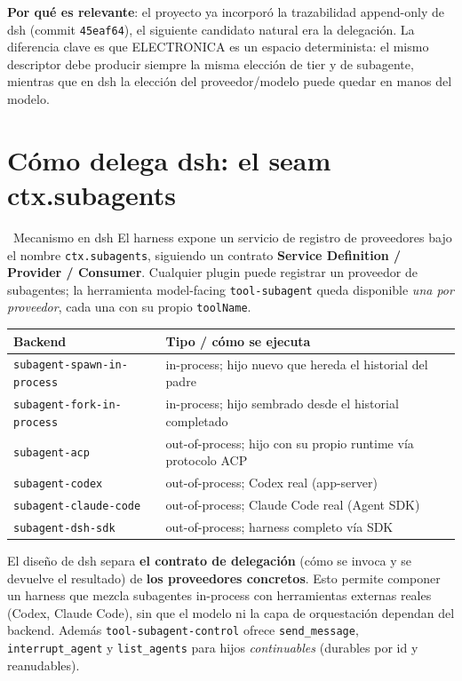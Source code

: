\documentclass[11pt,a4paper]{article}
\newcommand{\iconotexto}[2]{\textcolor{cyanNeon}{\faIcon{#1}}~#2}
\begin{document}
\textbf{Por qué es relevante}: el proyecto ya incorporó la trazabilidad append-only de dsh
(commit \texttt{45eaf64}), el siguiente candidato natural era la delegación. La diferencia
clave es que ELECTRONICA es un espacio determinista: el mismo descriptor debe producir
siempre la misma elección de tier y de subagente, mientras que en dsh la elección del
proveedor/modelo puede quedar en manos del modelo.

\section{Cómo delega dsh: el seam ctx.subagents}

\iconotexto{sitemap}{Mecanismo en dsh} El harness expone un servicio de registro de
proveedores bajo el nombre \texttt{ctx.subagents}, siguiendo un contrato
\textbf{Service Definition / Provider / Consumer}. Cualquier plugin puede registrar un
proveedor de subagentes; la herramienta model-facing \texttt{tool-subagent} queda
disponible \emph{una por proveedor}, cada una con su propio \texttt{toolName}.

\begin{tcolorbox}[tarjetaIcono, title={\faIcon{cubes}~Backends de proveedor en dsh}]
\begin{tabularx}{\linewidth}{@{}l X@{}}
\toprule
\textbf{Backend} & \textbf{Tipo / cómo se ejecuta} \\
\midrule
\texttt{subagent-spawn-in-process} & in-process; hijo nuevo que hereda el historial del padre \\
\texttt{subagent-fork-in-process} & in-process; hijo sembrado desde el historial completado \\
\texttt{subagent-acp} & out-of-process; hijo con su propio runtime vía protocolo ACP \\
\texttt{subagent-codex} & out-of-process; Codex real (app-server) \\
\texttt{subagent-claude-code} & out-of-process; Claude Code real (Agent SDK) \\
\texttt{subagent-dsh-sdk} & out-of-process; harness completo vía SDK \\
\bottomrule
\end{tabularx}
\end{tcolorbox}

\begin{tcolorbox}[cajaConcepto, title={One contract, many providers}]
El diseño de dsh separa \textbf{el contrato de delegación} (cómo se invoca y se
devuelve el resultado) de \textbf{los proveedores concretos}. Esto permite componer un
harness que mezcla subagentes in-process con herramientas externas reales (Codex,
Claude Code), sin que el modelo ni la capa de orquestación dependan del backend.
Además \texttt{tool-subagent-control} ofrece \texttt{send\_message},
\texttt{interrupt\_agent} y \texttt{list\_agents} para hijos \emph{continuables}
(durables por id y reanudables).
\end{tcolorbox}
\end{document}
